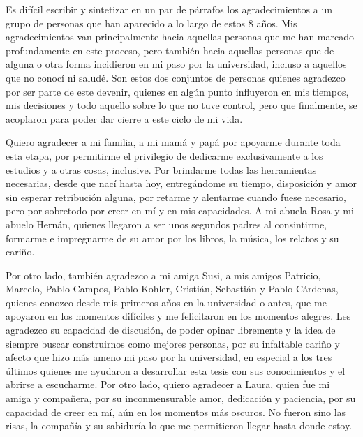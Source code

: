 
Es difícil escribir y sintetizar en un par de párrafos los agradecimientos a un grupo de personas que han aparecido a lo largo de estos 8 años. Mis agradecimientos van principalmente hacia aquellas personas que me han marcado profundamente en este proceso, pero también hacia aquellas personas que de alguna o otra forma incidieron en mi paso por la universidad, incluso a aquellos que no conocí ni saludé. Son estos dos conjuntos de personas quienes agradezco por ser parte de este devenir, quienes en algún punto influyeron en mis tiempos, mis decisiones y todo aquello sobre lo que no tuve control, pero que finalmente, se acoplaron para poder dar cierre a este ciclo de mi vida.

Quiero agradecer a mi familia, a mi mamá y papá por apoyarme durante toda esta etapa, por permitirme el privilegio de dedicarme exclusivamente a los estudios y a otras cosas, inclusive. Por brindarme todas las herramientas necesarias, desde que nací hasta hoy, entregándome su tiempo, disposición y amor sin esperar retribución alguna, por retarme y alentarme cuando fuese necesario, pero por sobretodo por creer en mí y en mis capacidades. A mi abuela Rosa y mi abuelo Hernán, quienes llegaron a ser unos segundos padres al consintirme, formarme e impregnarme de su amor por los libros, la música, los relatos y su cariño.

Por otro lado, también agradezco a mi amiga Susi, a mis amigos Patricio, Marcelo, Pablo Campos, Pablo Kohler, Cristián, Sebastián y Pablo Cárdenas, quienes conozco desde mis primeros años en la universidad o antes, que me apoyaron en los momentos difíciles y me felicitaron en los momentos alegres. Les agradezco su capacidad de discusión, de poder opinar libremente y la idea de siempre buscar construirnos como mejores personas, por su infaltable cariño y afecto que hizo más ameno mi paso por la universidad, en especial a los tres últimos quienes me ayudaron a desarrollar esta tesis con sus conocimientos y el abrirse a escucharme. Por otro lado, quiero agradecer a Laura, quien fue mi amiga y compañera, por su inconmensurable amor, dedicación y paciencia, por su capacidad de creer en mí, aún en los momentos más oscuros. No fueron sino las risas, la compañía y su sabiduría lo que me permitieron llegar hasta donde estoy.

